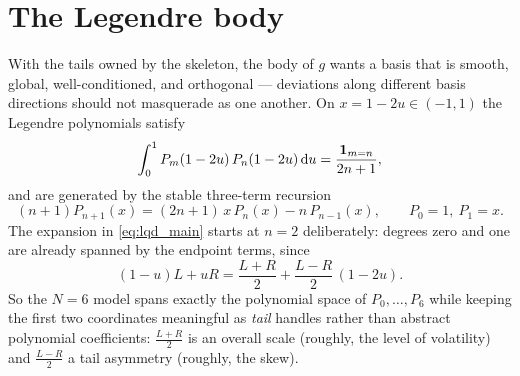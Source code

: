 \documentclass[11pt]{article}
\begin{document}
\section{The Legendre body}
\label{sec:body}

With the tails owned by the skeleton, the body of $g$ wants a basis that is
smooth, global, well-conditioned, and orthogonal --- deviations along
different basis directions should not masquerade as one another.  On
$x=1-2u\in(-1,1)$ the Legendre polynomials satisfy
\begin{equation}
\int_0^1 P_m(1-2u)\,P_n(1-2u)\,\mathrm{d} u=\frac{\mathbf{1}_{m=n}}{2n+1},
\label{eq:leg_orth}
\end{equation}
and are generated by the stable three-term recursion
\begin{equation}
(n+1)P_{n+1}(x)=(2n+1)\,x\,P_n(x)-n\,P_{n-1}(x),
\qquad P_0=1,\ P_1=x .
\label{eq:leg_recursion}
\end{equation}
The expansion in \eqref{eq:lqd_main} starts at $n=2$ deliberately: degrees
zero and one are already spanned by the endpoint terms, since
\begin{equation}
(1-u)L+uR=\frac{L+R}{2}+\frac{L-R}{2}\,(1-2u).
\label{eq:endpoint_span}
\end{equation}
So the $N=6$ model spans exactly the polynomial space of $P_0,\dots,P_6$
while keeping the first two coordinates meaningful as \emph{tail} handles
rather than abstract polynomial coefficients: $\frac{L+R}{2}$ is an overall
scale (roughly, the level of volatility) and $\frac{L-R}{2}$ a tail asymmetry
(roughly, the skew).
\end{document}

